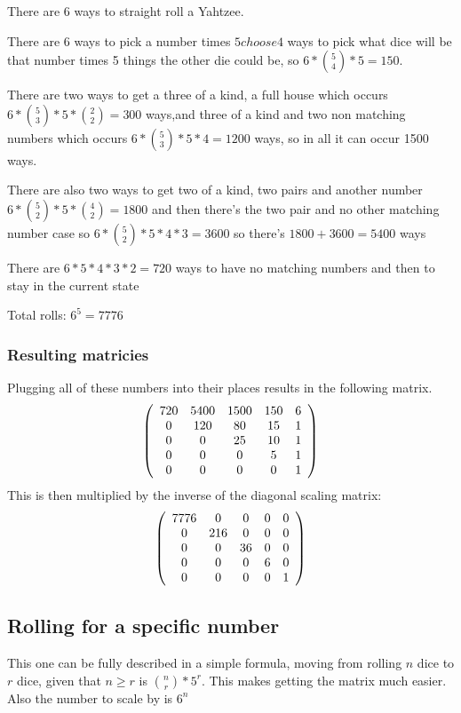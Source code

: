 There are 6 ways to straight roll a Yahtzee.

There are 6 ways to pick a number times ${5 choose 4}$ ways to pick what dice will be that number times 5 things the other die could be, so $6*{5 \choose 4} *5 = 150$.

There are two ways to get a three of a kind, a full house which occurs $6*{5 \choose 3}*5*{2 \choose 2}=300$ ways,and three of a kind and two non matching numbers which occurs $6*{5 \choose 3} *5*4=1200$ ways, so in all it can occur 1500 ways.

There are also two ways to get two of a kind, two pairs and another number $6*{5 \choose 2}*5*{4 \choose 2}=1800$ and then there's the two pair and no other matching number case so $6*{5 \choose 2}*5*4*3=3600$ so there's $1800+3600=5400$ ways

There are $6*5*4*3*2=720$ ways to have no matching numbers and then to stay in the current state

Total rolls: $6^5=7776$

\subsubsection{Resulting matricies}
Plugging all of these numbers into their places results in the following matrix.
\[
\left(
\begin{array}{c c c c c}
720 & 5400 & 1500 & 150 & 6 \\
0 & 120 & 80 & 15 & 1 \\
0 & 0 & 25 & 10 & 1 \\
0 & 0 & 0 & 5 & 1 \\
0 & 0 & 0 & 0 & 1
\end{array}
\right)
\]
This is then multiplied by the inverse of the diagonal scaling matrix:
\[
\left(
\begin{array}{c c c c c c}
7776& 0 	&0	&0	&0\\
0 	& 216	&0	&0	&0\\
0 	&0		&36	&0	&0\\
0 	&0		&0	&6	&0\\
0 	&0		&0	&0	&1
\end{array}
\right)
\]

\subsection{Rolling for a specific number}

This one can be fully described in a simple formula, moving from rolling $n$ dice to $r$ dice, given that $n \ge r$ is ${n \choose r} * 5^r$. This makes getting the matrix much easier. Also the number to scale by is $6^n$

